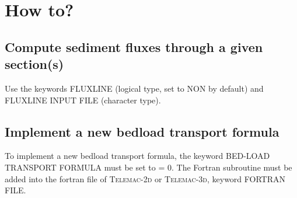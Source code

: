 \chapter[How to]{How to?}
\pagebreak
\section{Compute sediment fluxes through a given section(s)}
Use the keywords {\ttfamily FLUXLINE} (logical type, set to {\ttfamily NON} by default) and {\ttfamily FLUXLINE INPUT FILE} (character type).

\section{Implement a new bedload transport formula}
To implement a new bedload transport formula, the keyword {\ttfamily BED-LOAD TRANSPORT FORMULA} must be set to {\ttfamily = 0}. The Fortran subroutine must be added into the fortran file of \textsc{Telemac-2d} or \textsc{Telemac-3d}, keyword {\ttfamily FORTRAN FILE}.

